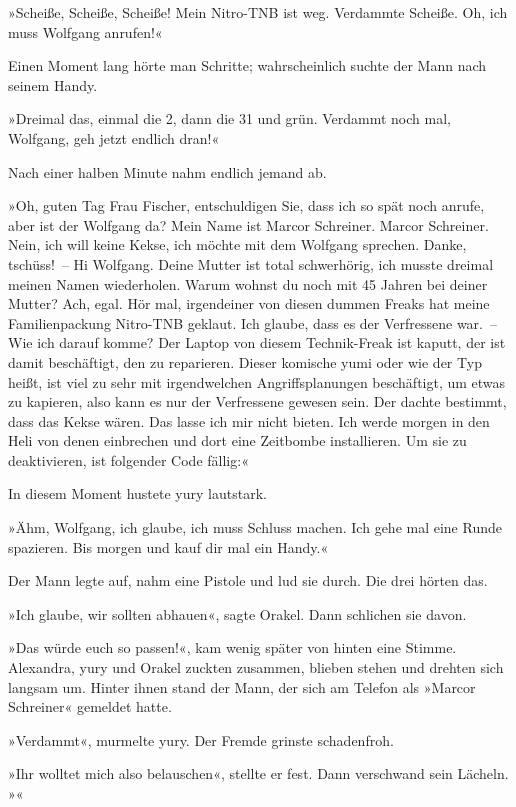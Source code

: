 »Scheiße, Scheiße, Scheiße! Mein Nitro-TNB ist weg. Verdammte Scheiße. Oh, ich muss Wolfgang anrufen!«

Einen Moment lang hörte man Schritte; wahrscheinlich suchte der Mann nach seinem Handy.

»Dreimal das, einmal die 2, dann die 31 und grün. Verdammt noch mal, Wolfgang, geh jetzt endlich dran!«

Nach einer halben Minute nahm endlich jemand ab.

»Oh, guten Tag Frau Fischer, entschuldigen Sie, dass ich so spät noch anrufe, aber ist der Wolfgang da?  Mein Name ist Marcor Schreiner. Marcor Schreiner.  Nein, ich will keine Kekse, ich möchte mit dem Wolfgang sprechen. Danke, tschüss!~– Hi Wolfgang. Deine Mutter ist total schwerhörig, ich musste dreimal meinen Namen wiederholen. Warum wohnst du noch mit 45 Jahren bei deiner Mutter? Ach, egal. Hör mal, irgendeiner von diesen dummen Freaks hat meine Familienpackung Nitro-TNB geklaut. Ich glaube, dass es der Verfressene war.~– Wie ich darauf komme? Der Laptop von diesem Technik-Freak ist kaputt, der ist damit beschäftigt, den zu reparieren. Dieser komische yumi oder wie der Typ heißt, ist viel zu sehr mit irgendwelchen Angriffsplanungen beschäftigt, um etwas zu kapieren, also kann es nur der Verfressene gewesen sein. Der dachte bestimmt, dass das Kekse wären. Das lasse ich mir nicht bieten. Ich werde morgen in den Heli von denen einbrechen und dort eine Zeitbombe installieren. Um sie zu deaktivieren, ist folgender Code fällig:«

In diesem Moment hustete yury lautstark.

»Ähm, Wolfgang, ich glaube, ich muss Schluss machen. Ich gehe mal eine Runde spazieren. Bis morgen und kauf dir mal ein Handy.«

Der Mann legte auf, nahm eine Pistole und lud sie durch. Die drei hörten das.

»Ich glaube, wir sollten abhauen«, sagte Orakel. Dann schlichen sie davon.

»Das würde euch so passen!«, kam wenig später von hinten eine Stimme. Alexandra, yury und Orakel zuckten zusammen, blieben stehen und drehten sich langsam um. Hinter ihnen stand der Mann, der sich am Telefon als »Marcor Schreiner« gemeldet hatte.

»Verdammt«, murmelte yury. Der Fremde grinste schadenfroh.

»Ihr wolltet mich also belauschen«, stellte er fest. Dann verschwand sein Lächeln. »«

